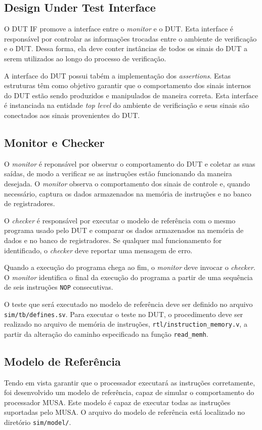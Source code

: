 \documentclass{article}
\begin{document}
	\subsection{Design Under Test Interface}
	
	O DUT IF promove a interface entre o \textit{monitor} e o DUT. Esta interface é responsável por controlar as informações trocadas entre o ambiente de verificação e o DUT. Dessa forma, ela deve conter instâncias de todos os sinais do DUT a serem utilizados ao longo do processo de verificação.
	
  A interface do DUT possui tabém a implementação dos \textit{assertions}. Estas estruturas têm como objetivo garantir que o comportamento dos sinais internos do DUT estão sendo produzidos e manipulados de maneira correta. Esta interface é instanciada na entidade \textit{top level} do ambiente de verificiação e seus sinais são conectados aos sinais provenientes do DUT.

	\subsection{Monitor e Checker}
	
  O \textit{monitor} é reponsável por observar o comportamento do DUT e coletar as suas saídas, de modo a verificar se as instruções estão funcionando da maneira desejada. O \textit{monitor} observa o comportamento dos sinais de controle e, quando necessário, captura os dados armazenados na memória de instruções e no banco de registradores.
	
  O \textit{checker} é responsável por executar o modelo de referência com o mesmo programa usado pelo DUT e comparar os dados armazenados na memória de dados e no banco de registradores. Se qualquer mal funcionamento for identificado, o \textit{checker} deve reportar uma mensagem de erro.

  Quando a execução do programa chega ao fim, o \textit{monitor} deve invocar o \textit{checker}. O \textit{monitor} identifica o final da execução do programa a partir de uma sequência de seis instruções \texttt{NOP} consecutivas.

	O teste que será executado no modelo de referência deve ser definido no arquivo \texttt{sim/tb/defines.sv}. Para executar o teste no DUT, o procedimento deve ser realizado no arquivo de memória de instruções, \texttt{rtl/instruction\_memory.v}, a partir da alteração do caminho especificado na função \texttt{read\_memh}.

	\subsection{Modelo de Referência}
  Tendo em vista garantir que o processador executará as instruções corretamente, foi desenvolvido um modelo de referência, capaz de simular o comportamento do processador MUSA. Este modelo é capaz de executar todas as instruções suportadas pelo MUSA. O arquivo do modelo de referência está localizado no diretório \texttt{sim/model/}.
	
\end{document}
